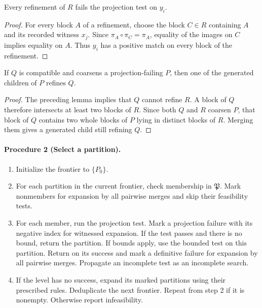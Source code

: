 \begin{lemma}
Every refinement of \(R\) fails the projection test on \(y_i\).
\end{lemma}
\begin{proof}
For every block \(A\) of a refinement, choose the block \(C\in R\)
containing \(A\) and its recorded witness \(x_j\).
Since \(\pi_A\circ\pi_C=\pi_A\), equality of the images on \(C\)
implies equality on \(A\). Thus \(y_i\) has a positive match on every
block of the refinement.
\end{proof}

\begin{lemma}
If \(Q\) is compatible and coarsens a projection-failing \(P\), then
one of the generated children of \(P\) refines \(Q\).
\end{lemma}
\begin{proof}
The preceding lemma implies that \(Q\) cannot refine \(R\).
A block of \(Q\) therefore intersects at least two blocks of \(R\).
Since both \(Q\) and \(R\) coarsen \(P\), that block of \(Q\) contains
two whole blocks of \(P\) lying in distinct blocks of \(R\). Merging
them gives a generated child still refining \(Q\).
\end{proof}

\paragraph{Procedure 2 (Select a partition).}
\begin{enumerate}
\item Initialize the frontier to \(\{P_0\}\).
\item For each partition in the current frontier, check membership in
  \(\mathfrak P\). Mark nonmembers for expansion by all pairwise merges
  and skip their feasibility tests.
\item For each member, run the projection test. Mark a projection failure
  with its negative index for witnessed expansion. If the test passes
  and there is no bound, return the partition. If bounds apply, use the
  bounded test on this partition. Return on its success and mark a
  definitive failure for expansion by all pairwise merges. Propagate
  an incomplete test as an incomplete search.
\item If the level has no success, expand its marked partitions using
  their prescribed rules. Deduplicate the next frontier. Repeat from
  step 2 if it is nonempty. Otherwise report infeasibility.
\end{enumerate}

